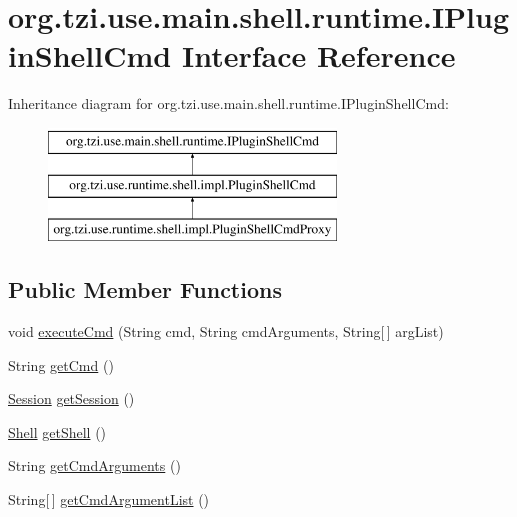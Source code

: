 \hypertarget{interfaceorg_1_1tzi_1_1use_1_1main_1_1shell_1_1runtime_1_1_i_plugin_shell_cmd}{\section{org.\-tzi.\-use.\-main.\-shell.\-runtime.\-I\-Plugin\-Shell\-Cmd Interface Reference}
\label{interfaceorg_1_1tzi_1_1use_1_1main_1_1shell_1_1runtime_1_1_i_plugin_shell_cmd}
}
Inheritance diagram for org.\-tzi.\-use.\-main.\-shell.\-runtime.\-I\-Plugin\-Shell\-Cmd\-:\begin{figure}[H]
\begin{center}
\leavevmode
\includegraphics[height=3.000000cm]{interfaceorg_1_1tzi_1_1use_1_1main_1_1shell_1_1runtime_1_1_i_plugin_shell_cmd}
\end{center}
\end{figure}
\subsection*{Public Member Functions}
\begin{DoxyCompactItemize}
\item 
void \hyperlink{interfaceorg_1_1tzi_1_1use_1_1main_1_1shell_1_1runtime_1_1_i_plugin_shell_cmd_ad9f9b072c07d28f02c70127579571b69}{execute\-Cmd} (String cmd, String cmd\-Arguments, String\mbox{[}$\,$\mbox{]} arg\-List)
\item 
String \hyperlink{interfaceorg_1_1tzi_1_1use_1_1main_1_1shell_1_1runtime_1_1_i_plugin_shell_cmd_abd06aa821677bf6f1a7ad40b91be86a4}{get\-Cmd} ()
\item 
\hyperlink{classorg_1_1tzi_1_1use_1_1main_1_1_session}{Session} \hyperlink{interfaceorg_1_1tzi_1_1use_1_1main_1_1shell_1_1runtime_1_1_i_plugin_shell_cmd_a21945bfc57dbfa8f4937c8e1b710feea}{get\-Session} ()
\item 
\hyperlink{classorg_1_1tzi_1_1use_1_1main_1_1shell_1_1_shell}{Shell} \hyperlink{interfaceorg_1_1tzi_1_1use_1_1main_1_1shell_1_1runtime_1_1_i_plugin_shell_cmd_a97d9bf4e525cae13c2410dc4b7d63c54}{get\-Shell} ()
\item 
String \hyperlink{interfaceorg_1_1tzi_1_1use_1_1main_1_1shell_1_1runtime_1_1_i_plugin_shell_cmd_ad1c05ba0af86cf17a9cc5f35ff038c36}{get\-Cmd\-Arguments} ()
\item 
String\mbox{[}$\,$\mbox{]} \hyperlink{interfaceorg_1_1tzi_1_1use_1_1main_1_1shell_1_1runtime_1_1_i_plugin_shell_cmd_a8fb5007cf4ba4b2e04ddec03c8076993}{get\-Cmd\-Argument\-List} ()
\end{DoxyCompactItemize}


